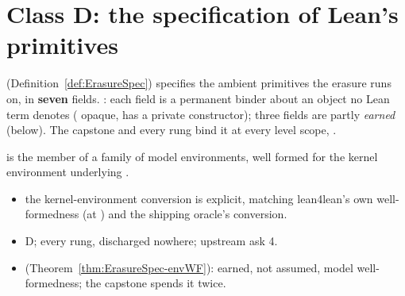 \section{Class D: the specification of Lean's primitives}
\label{sec:trust:spec}

 (Definition~\ref{def:ErasureSpec}) specifies the ambient
primitives the erasure runs on, in \textbf{seven} fields. : each field is
a permanent binder about an object no Lean term denotes ( opaque,
 has a private constructor); three fields are partly \emph{earned} (below).
The capstone and every rung bind it at every level scope, .

\begin{assumption}
\label{asm:ErasureSpec-env_connect}
\leanok
{}
\stAssumed{}   is the  member of a family of model
environments, well formed for the kernel environment underlying .
\begin{itemize}
\item {} the kernel-environment conversion is explicit, matching lean4lean's own
well-formedness (at ) and the shipping oracle's conversion.
\item {} D;  every rung, discharged nowhere;  upstream ask 4.
\item {}  (Theorem~\ref{thm:ErasureSpec-envWF}): earned, not
assumed, model well-formedness; the capstone spends it twice.
\end{itemize}
\end{assumption}

